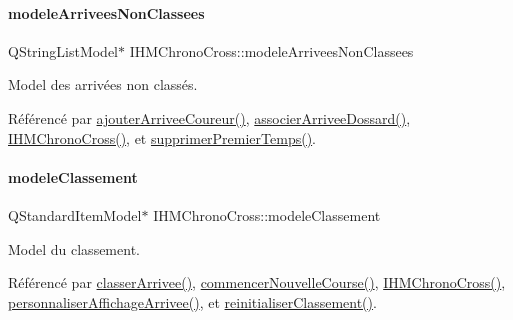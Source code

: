 \mbox{\label{class_i_h_m_chrono_cross_a12a210c6a93f70df764841b7d322b05c}} 
\paragraph{\texorpdfstring{modele\+Arrivees\+Non\+Classees}{modeleArriveesNonClassees}}
{\footnotesize\ttfamily Q\+String\+List\+Model$\ast$ I\+H\+M\+Chrono\+Cross\+::modele\+Arrivees\+Non\+Classees\hspace{0.3cm}{\ttfamily [private]}}



Model des arrivées non classés. 



Référencé par \hyperlink{class_i_h_m_chrono_cross_a2ce63851d1f2723057ac649b7e320cfe}{ajouter\+Arrivee\+Coureur()}, \hyperlink{class_i_h_m_chrono_cross_a9f7f1ad130b60300a879694b6234f161}{associer\+Arrivee\+Dossard()}, \hyperlink{class_i_h_m_chrono_cross_a479fc90733fba3e65fb06aa4a3adc02e}{I\+H\+M\+Chrono\+Cross()}, et \hyperlink{class_i_h_m_chrono_cross_aca8b5d6683a3ab0018066ec16968f3f3}{supprimer\+Premier\+Temps()}.

\mbox{\label{class_i_h_m_chrono_cross_ac25c95280801f36c43a1c41cf2fa253e}} 
\paragraph{\texorpdfstring{modele\+Classement}{modeleClassement}}
{\footnotesize\ttfamily Q\+Standard\+Item\+Model$\ast$ I\+H\+M\+Chrono\+Cross\+::modele\+Classement\hspace{0.3cm}{\ttfamily [private]}}



Model du classement. 



Référencé par \hyperlink{class_i_h_m_chrono_cross_a5e9b561659ba63d2739335b8ab432cbf}{classer\+Arrivee()}, \hyperlink{class_i_h_m_chrono_cross_ab899a1d60c1f853b199abb937ae08e74}{commencer\+Nouvelle\+Course()}, \hyperlink{class_i_h_m_chrono_cross_a479fc90733fba3e65fb06aa4a3adc02e}{I\+H\+M\+Chrono\+Cross()}, \hyperlink{class_i_h_m_chrono_cross_a41c2ff49d25069f8dfa2a7b3d0606d38}{personnaliser\+Affichage\+Arrivee()}, et \hyperlink{class_i_h_m_chrono_cross_aaf8fa3bf16956fd0e0ceeab6e65f6741}{reinitialiser\+Classement()}.


